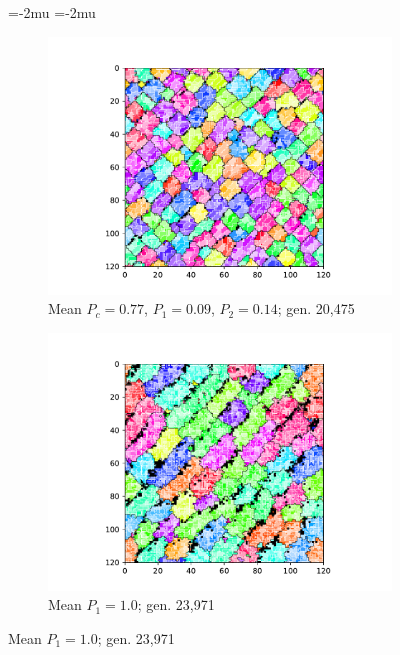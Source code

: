 \begin{figure}[!htbp]
\begin{center}
\thinmuskip=-2mu
\thickmuskip=-2mu
\nulldelimiterspace=-1pt
\scriptspace=0pt
\begin{subfigure}[b]{0.80\columnwidth}
  \includegraphics[width=\columnwidth,trim={2.5cm 0.5cm 2.5cm 1cm},clip]{img/ChannelMap_1022_update19500000}
  \caption{Mean $P_{c} = 0.77$, $P_1 = 0.09$, $P_2 = 0.14$; gen. 20,475}
  \label{fig:ChannelMap_1022}
\end{subfigure}

\begin{subfigure}[b]{0.80\columnwidth}
  \includegraphics[width=\columnwidth,trim={2.5cm 0.5cm 2.5cm 1cm},clip]{img/ChannelMap_1041_update19500000}
  \caption{Mean $P_1 = 1.0$; gen. 23,971}
  \label{fig:ChannelMap_1041}
\end{subfigure}


\end{center}
\end{figure}
